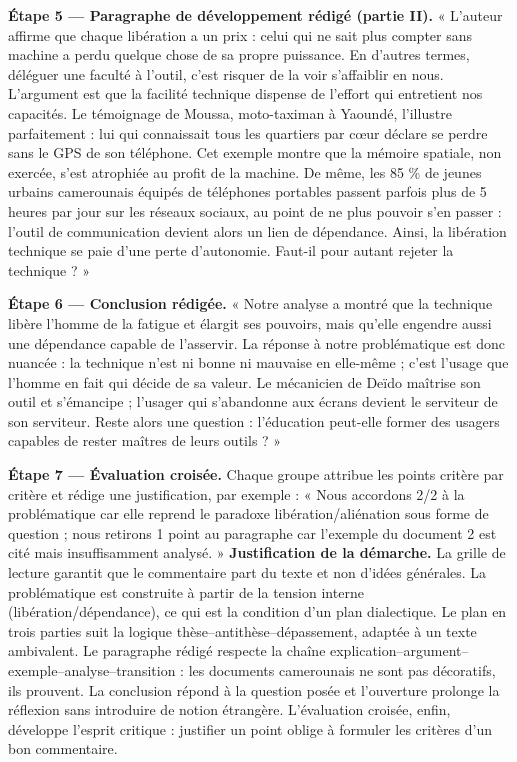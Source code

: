 \documentclass[11pt]{article}
\begin{document}
\begin{exoresolu}
\textbf{Étape 5 — Paragraphe de développement rédigé (partie II).} « L'auteur affirme que chaque libération a un prix : celui qui ne sait plus compter sans machine a perdu quelque chose de sa propre puissance. En d'autres termes, déléguer une faculté à l'outil, c'est risquer de la voir s'affaiblir en nous. L'argument est que la facilité technique dispense de l'effort qui entretient nos capacités. Le témoignage de Moussa, moto-taximan à Yaoundé, l'illustre parfaitement : lui qui connaissait tous les quartiers par cœur déclare se perdre sans le GPS de son téléphone. Cet exemple montre que la mémoire spatiale, non exercée, s'est atrophiée au profit de la machine. De même, les 85 \% de jeunes urbains camerounais équipés de téléphones portables passent parfois plus de 5 heures par jour sur les réseaux sociaux, au point de ne plus pouvoir s'en passer : l'outil de communication devient alors un lien de dépendance. Ainsi, la libération technique se paie d'une perte d'autonomie. Faut-il pour autant rejeter la technique ? »

\textbf{Étape 6 — Conclusion rédigée.} « Notre analyse a montré que la technique libère l'homme de la fatigue et élargit ses pouvoirs, mais qu'elle engendre aussi une dépendance capable de l'asservir. La réponse à notre problématique est donc nuancée : la technique n'est ni bonne ni mauvaise en elle-même ; c'est l'usage que l'homme en fait qui décide de sa valeur. Le mécanicien de Deïdo maîtrise son outil et s'émancipe ; l'usager qui s'abandonne aux écrans devient le serviteur de son serviteur. Reste alors une question : l'éducation peut-elle former des usagers capables de rester maîtres de leurs outils ? »

\textbf{Étape 7 — Évaluation croisée.} Chaque groupe attribue les points critère par critère et rédige une justification, par exemple : « Nous accordons 2/2 à la problématique car elle reprend le paradoxe libération/aliénation sous forme de question ; nous retirons 1 point au paragraphe car l'exemple du document 2 est cité mais insuffisamment analysé. »
\tcblower
\textbf{Justification de la démarche.} La grille de lecture garantit que le commentaire part du texte et non d'idées générales. La problématique est construite à partir de la tension interne (libération/dépendance), ce qui est la condition d'un plan dialectique. Le plan en trois parties suit la logique thèse--antithèse--dépassement, adaptée à un texte ambivalent. Le paragraphe rédigé respecte la chaîne explication--argument--exemple--analyse--transition : les documents camerounais ne sont pas décoratifs, ils prouvent. La conclusion répond à la question posée et l'ouverture prolonge la réflexion sans introduire de notion étrangère. L'évaluation croisée, enfin, développe l'esprit critique : justifier un point oblige à formuler les critères d'un bon commentaire.
\end{exoresolu}
\end{document}
